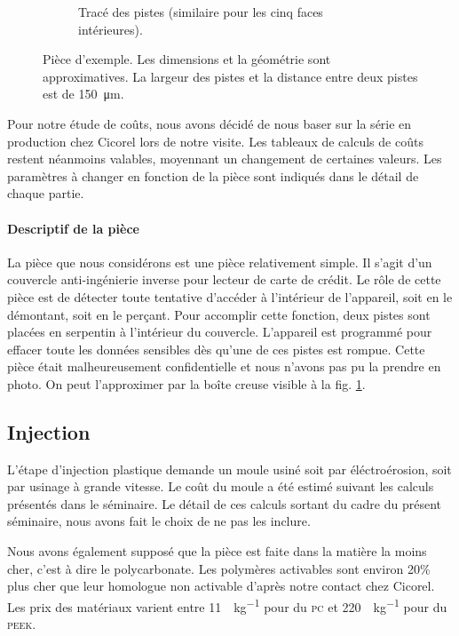 \begin{figure}[h]
\begin{subfigure}[t]{0.4\textwidth}
                \caption{Tracé des pistes (similaire pour les cinq faces intérieures).}
        \end{subfigure}

        \caption{Pièce d'exemple. Les dimensions et la géométrie sont approximatives. La largeur des pistes et la distance entre deux pistes est de \SI{150}{\micro\meter}.}
        \label{fig:example-part}
\end{figure}
Pour notre étude de coûts, nous avons décidé de nous baser sur la série en production chez Cicorel lors de notre visite.
Les tableaux de calculs de coûts restent néanmoins valables, moyennant un changement de certaines valeurs.
Les paramètres à changer en fonction de la pièce sont indiqués dans le détail de chaque partie.


\paragraph{Descriptif de la pièce}
La pièce que nous considérons est une pièce relativement simple.
Il s'agit d'un couvercle anti-ingénierie inverse pour lecteur de carte de crédit.
Le rôle de cette pièce est de détecter toute tentative d'accéder à l'intérieur de l'appareil, soit en le démontant, soit en le perçant.
Pour accomplir cette fonction, deux pistes sont placées en serpentin à l'intérieur du couvercle.
L'appareil est programmé pour effacer toute les données sensibles dès qu'une de ces pistes est rompue.
Cette pièce était malheureusement confidentielle et nous n'avons pas pu la prendre en photo.
On peut l'approximer par la boîte creuse visible à la fig. \ref{fig:example-part}.


\subsection{Injection}

L'étape d'injection plastique demande un moule usiné soit par éléctroérosion, soit par usinage à grande vitesse.
Le coût du moule a été estimé suivant les calculs présentés dans le séminaire\cite{electroerosion-2013}.
Le détail de ces calculs sortant du cadre du présent séminaire, nous avons fait le choix de ne pas les inclure. 

Nous avons également supposé que la pièce est faite dans la matière la moins cher, c'est à dire le polycarbonate.
Les polymères activables sont environ 20\% plus cher que leur homologue non activable d'après notre contact chez Cicorel.
Les prix des matériaux varient entre \SI{11}{\chf\per\kilogram} pour du \textsc{pc} et \SI{220}{\chf\per\kilogram} pour du \textsc{peek}.

